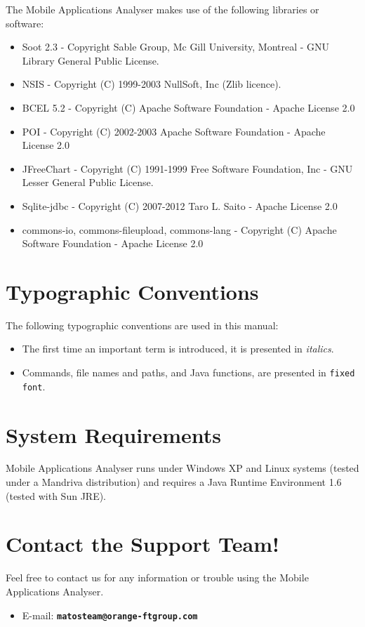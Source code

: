 \documentclass[a4paper]{book}
\newcommand{\ma}{Mobile Applications Analyser\xspace}
\begin{document}
The \ma makes use of the following libraries or software:
\begin{itemize}
\item Soot 2.3 - Copyright Sable Group, Mc Gill University, Montreal -
GNU Library General Public License. 
\item NSIS - Copyright (C) 1999-2003 NullSoft, Inc (Zlib licence).
\item BCEL 5.2 - Copyright (C) Apache Software Foundation - Apache License 2.0
\item POI - Copyright (C) 2002-2003 Apache Software Foundation - Apache License
2.0
\item JFreeChart - Copyright (C) 1991-1999 Free Software Foundation, Inc -
GNU Lesser General Public License.
\item Sqlite-jdbc - Copyright (C) 2007-2012 Taro L. Saito - Apache License 2.0
\item commons-io, commons-fileupload, commons-lang - Copyright (C) Apache Software Foundation - Apache License 2.0
\end{itemize}

\section*{Typographic Conventions}
The following typographic conventions are used in this manual:
\begin{itemize}
\item The first time an important term is introduced, it is presented
  in \emph{italics}.
\item Commands, file names and paths, and Java functions, are presented in \texttt{fixed font}.
\end{itemize}

\section*{System Requirements} \label{SysReqs} 
\ma runs under Windows XP and Linux systems (tested under a Mandriva
distribution) and requires a Java Runtime Environment 1.6 (tested with Sun JRE).

\section*{Contact the Support Team!}
Feel free to contact us for any information or trouble using the
\ma.
\begin{itemize}
\item E-mail: \texttt{\textbf{matosteam@orange-ftgroup.com}}
\end{itemize}
\end{document}
